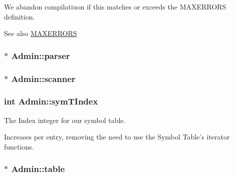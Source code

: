 We abandon compilatiuon if this matches or exceeds the MAXERRORS definition. \begin{DoxySeeAlso}{See also}
\hyperlink{admin_8h_abfea00ff3da8375f9fdd7a6608632e42}{MAXERRORS} 
\end{DoxySeeAlso}
\hypertarget{classAdmin_a0fe59c6a08ae239bee02a58180fef8c3}{
\subsubsection[{parser}]{$\ast$ {\bf Admin::parser}}}
\label{classAdmin_a0fe59c6a08ae239bee02a58180fef8c3}
\hypertarget{classAdmin_a6846c5ec5e565001a18a20167ff7b3cf}{
\subsubsection[{scanner}]{$\ast$ {\bf Admin::scanner}}}
\label{classAdmin_a6846c5ec5e565001a18a20167ff7b3cf}
\hypertarget{classAdmin_ae1c48226f950c3e470785785aff4d536}{
\subsubsection[{symTIndex}]{\setlength{\rightskip}{0pt plus 5cm}int {\bf Admin::symTIndex}}}
\label{classAdmin_ae1c48226f950c3e470785785aff4d536}


The Index integer for our symbol table. 

Increases per entry, removing the need to use the Symbol Table's iterator functions. \hypertarget{classAdmin_afb5161f047f166b985257447b9c47f22}{
\subsubsection[{table}]{$\ast$ {\bf Admin::table}}}
\label{classAdmin_afb5161f047f166b985257447b9c47f22}


